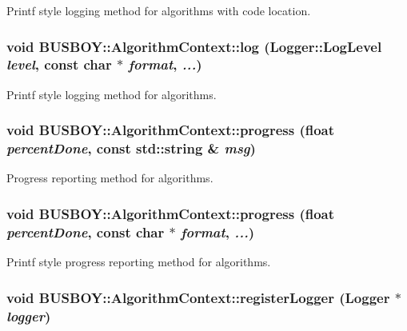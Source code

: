 Printf style logging method for algorithms with code location. \hypertarget{classBUSBOY_1_1AlgorithmContext_ad34588d7242c99541351256fff32a352}{
\subsubsection[{log}]{\setlength{\rightskip}{0pt plus 5cm}void BUSBOY::AlgorithmContext::log ({\bf Logger::LogLevel} {\em level}, \/  const char $\ast$ {\em format}, \/   {\em ...})}}
\label{classBUSBOY_1_1AlgorithmContext_ad34588d7242c99541351256fff32a352}


Printf style logging method for algorithms. \hypertarget{classBUSBOY_1_1AlgorithmContext_af7cd5e155ce3598f21e9130f36ae258a}{
\subsubsection[{progress}]{\setlength{\rightskip}{0pt plus 5cm}void BUSBOY::AlgorithmContext::progress (float {\em percentDone}, \/  const std::string \& {\em msg})}}
\label{classBUSBOY_1_1AlgorithmContext_af7cd5e155ce3598f21e9130f36ae258a}


Progress reporting method for algorithms. \hypertarget{classBUSBOY_1_1AlgorithmContext_aa5bcd4c4eef6881a044ac49a949893ee}{
\subsubsection[{progress}]{\setlength{\rightskip}{0pt plus 5cm}void BUSBOY::AlgorithmContext::progress (float {\em percentDone}, \/  const char $\ast$ {\em format}, \/   {\em ...})}}
\label{classBUSBOY_1_1AlgorithmContext_aa5bcd4c4eef6881a044ac49a949893ee}


Printf style progress reporting method for algorithms. \hypertarget{classBUSBOY_1_1AlgorithmContext_a4ea5204f7bfb563ae6e1a90a152a15e8}{
\subsubsection[{registerLogger}]{\setlength{\rightskip}{0pt plus 5cm}void BUSBOY::AlgorithmContext::registerLogger ({\bf Logger} $\ast$ {\em logger})}}
\label{classBUSBOY_1_1AlgorithmContext_a4ea5204f7bfb563ae6e1a90a152a15e8}


